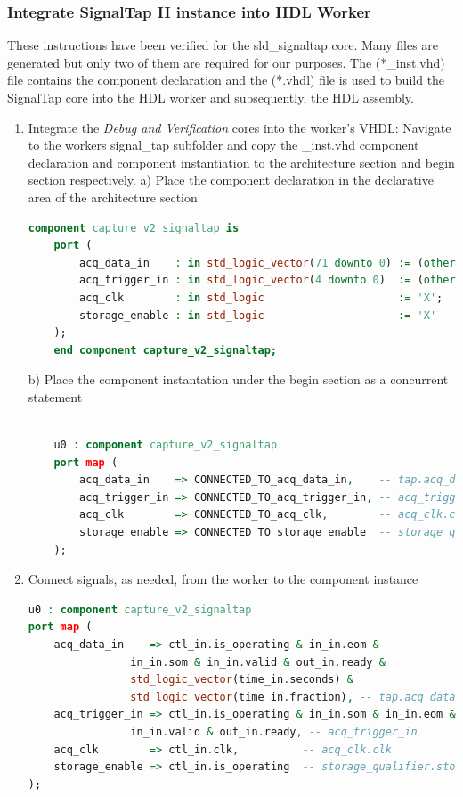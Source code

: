 \begin{flushleft}
	\subsubsection{Integrate SignalTap II instance into HDL Worker}
	These instructions have been verified for the sld\_signaltap core. Many files are generated but only two of them are required for our purposes.  The (*\_inst.vhd) file contains the component declaration and the (*.vhdl) file is used to build the SignalTap core into the HDL worker and subsequently, the HDL assembly.
		\begin{enumerate}
			\item Integrate the \textit{Debug and Verification} cores into the worker's VHDL:  
			 Navigate to the workers signal\_tap subfolder and copy the \_inst.vhd component declaration and component instantiation to the architecture section and begin section respectively.
				\subitem a) Place the component declaration in the declarative area of the architecture section
				\begin{lstlisting}[language=VHDL]
	component capture_v2_signaltap is
	port (
	    acq_data_in    : in std_logic_vector(71 downto 0) := (others => 'X'); -- acq_data_in
	    acq_trigger_in : in std_logic_vector(4 downto 0)  := (others => 'X'); -- acq_trigger_in
	    acq_clk        : in std_logic                     := 'X';             -- clk
	    storage_enable : in std_logic                     := 'X'              -- storage_enable
	);
	end component capture_v2_signaltap;
				\end{lstlisting}
				\subitem b) Place the component instantation under the begin section as a concurrent statement
				\begin{lstlisting}[language=VHDL]

	u0 : component capture_v2_signaltap
	port map (
		acq_data_in    => CONNECTED_TO_acq_data_in,    -- tap.acq_data_in
		acq_trigger_in => CONNECTED_TO_acq_trigger_in, -- acq_trigger_in
		acq_clk        => CONNECTED_TO_acq_clk,        -- acq_clk.clk
		storage_enable => CONNECTED_TO_storage_enable  -- storage_qualifier.storage_enable
	);
				\end{lstlisting}
				\item Connect signals, as needed, from the worker to the component instance 
				\begin{lstlisting}[language=VHDL]
u0 : component capture_v2_signaltap
port map (
	acq_data_in    => ctl_in.is_operating & in_in.eom & 
				in_in.som & in_in.valid & out_in.ready & 
			 	std_logic_vector(time_in.seconds) &
			 	std_logic_vector(time_in.fraction), -- tap.acq_data_in
	acq_trigger_in => ctl_in.is_operating & in_in.som & in_in.eom & 
				in_in.valid & out_in.ready, -- acq_trigger_in
	acq_clk        => ctl_in.clk,          -- acq_clk.clk
	storage_enable => ctl_in.is_operating  -- storage_qualifier.storage_enable
);
				\end{lstlisting}
			

\end{enumerate}
\end{flushleft}
